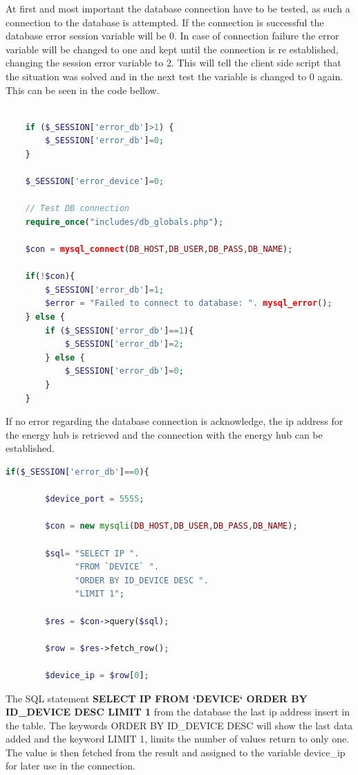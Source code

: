 At first and most important the database connection have to be tested, as such a connection to the database is attempted. If the connection is successful the database error session variable will be 0. In case of connection failure the error variable will be changed to one and kept until the connection is re established, changing the session error variable to 2. This will tell the client side script that the situation was solved and in the next test the variable is changed to 0 again. This can be seen in the code bellow.
\begin{lstlisting}[language=php]
	
	if ($_SESSION['error_db']>1) { 
		$_SESSION['error_db']=0;
	}

	$_SESSION['error_device']=0;

	// Test DB connection
	require_once("includes/db_globals.php");
	
	$con = mysql_connect(DB_HOST,DB_USER,DB_PASS,DB_NAME);
	
	if(!$con){
		$_SESSION['error_db']=1;
		$error = "Failed to connect to database: ". mysql_error();
	} else {
		if ($_SESSION['error_db']==1){
			$_SESSION['error_db']=2;
		} else {
			$_SESSION['error_db']=0;	
		}
	}
\end{lstlisting}

If no error regarding the database connection is acknowledge, the ip address for the energy hub is retrieved and the connection with the energy hub can be established.

\begin{lstlisting}[language=php]
if($_SESSION['error_db']==0){
		
		$device_port = 5555;
		
		$con = new mysqli(DB_HOST,DB_USER,DB_PASS,DB_NAME);
		
		$sql= "SELECT IP ". 
			  "FROM `DEVICE` ". 
			  "ORDER BY ID_DEVICE DESC ".
			  "LIMIT 1";
		
		$res = $con->query($sql);
		
		$row = $res->fetch_row();
		
		$device_ip = $row[0];
\end{lstlisting}

The SQL statement  \textbf{SELECT IP FROM `DEVICE` ORDER BY ID\_DEVICE DESC LIMIT 1} from the database the last ip address insert in the table. The keywords ORDER BY ID\_DEVICE DESC will show the last data added and the keyword LIMIT 1, limits the number of values return to only one. The value is then fetched from the result and assigned to the variable device\_ip for later use in the connection.

